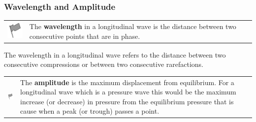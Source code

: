             \subsubsection{ Wavelength and Amplitude}
            \nopagebreak
\par
            \label{m38782*fhsst!!!underscore!!!id125}\begin{definition}
	  \begin{tabular*}{15 cm}{m{15 mm}m{}}
	\hspace*{-50pt}  \includegraphics[width=0.5in]{col11305.imgs/psflag2.png}   & \Definition{   \label{id2445839}\textbf{ Wavelength }} { \label{m38782*meaningfhsst!!!underscore!!!id125}
        The \textbf{wavelength} in a longitudinal wave is the distance between two consecutive points that are in phase. 
         } 
      \end{tabular*}
      \end{definition}
        \label{m38782*id292427}The wavelength in a longitudinal wave refers to the distance between two consecutive compressions or between two consecutive rarefactions.\par 
\label{m38782*fhsst!!!underscore!!!id129}\begin{definition}
	  \begin{tabular*}{15 cm}{m{15 mm}m{}}
	\hspace*{-50pt}  \includegraphics[width=0.5in]{col11305.imgs/psflag2.png}   & \Definition{   \label{id2445871}\textbf{ Amplitude }} { \label{m38782*meaningfhsst!!!underscore!!!id129}
        The \textbf{amplitude} is the maximum displacement from equilibrium. For a longitudinal wave which is a pressure wave this would be the maximum increase (or decrease) in pressure from the equilibrium pressure that is cause when a peak (or trough) passes a point.
         } 
      \end{tabular*}
      \end{definition}
    \setcounter{subfigure}{0}
